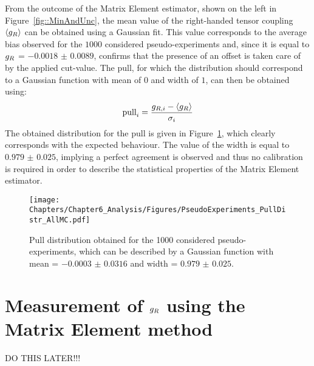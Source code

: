 From the outcome of the Matrix Element estimator, shown on the left in Figure~\ref{fig::MinAndUnc}, the mean value of the right-handed tensor coupling $\left\langle g_{R} \right\rangle$ can be obtained using a Gaussian fit.
This value corresponds to the average bias observed for the $1 000$ considered pseudo-experiments and, since it is equal to $g_{R}$ = $-0.0018$ $\pm$ $0.0089$, confirms that the presence of an offset is taken care of by the applied cut-value.
The pull, for which the distribution should correspond to a Gaussian function with mean of $0$ and width of $1$, can then be obtained using:
\begin{equation}
 \textrm{pull}_{i} = \frac{g_{R,i} - \left\langle g_{R} \right\rangle}{\sigma_{i}}
\end{equation}
The obtained distribution for the pull is given in Figure~\ref{fig::PullDistr}, which clearly corresponds with the expected behaviour.
The value of the width is equal to $0.979$ $\pm$ $0.025$, implying a perfect agreement is observed and thus no calibration is required in order to describe the statistical properties of the Matrix Element estimator.
\newpage
\begin{figure}[h!t]
 \centering
 \texttt{[image: Chapters/Chapter6\_Analysis/Figures/PseudoExperiments\_PullDistr\_AllMC.pdf]}
 \caption{Pull distribution obtained for the 1000 considered pseudo-experiments, which can be described by a Gaussian function with mean = $-0.0003$ $\pm$ $0.0316$ and width = $0.979$ $\pm$ $0.025$.} \label{fig::PullDistr}
\end{figure}

\newpage
\section{Measurement of $g_{R}$ using the Matrix Element method} \label{sec::gRMeas}
DO THIS LATER!!!

